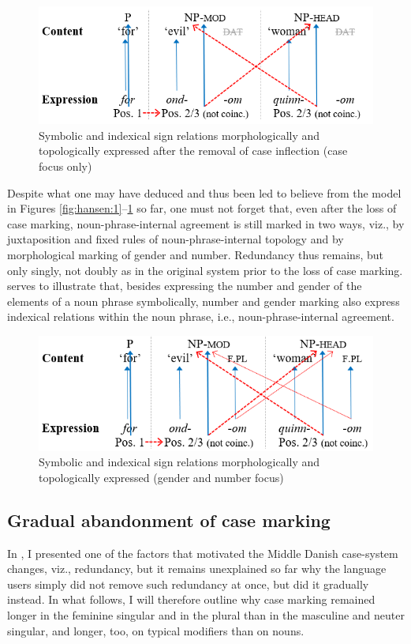 \documentclass[output=paper]{langsci/langscibook}
\begin{document}
\begin{figure}
	\caption{Symbolic and indexical sign relations morphologically and topologically expressed after the removal of case inflection (case focus only)\label{fig:hansen:5}}
	\includegraphics[width=.75\textwidth]{figures/Hansen-fig5.png}
\end{figure}


Despite what one may have deduced and thus been led to believe from the model in Figures \ref{fig:hansen:1}--\ref{fig:hansen:5} so far, one must not forget that, even after the loss of case marking, noun-phrase-internal agreement is still marked in two ways, viz., by juxtaposition and fixed rules of noun-phrase-internal topology and by morphological marking of gender and number. Redundancy thus remains, but only singly, not doubly as in the original system prior to the loss of case marking.  serves to illustrate that, besides expressing the number and gender of the elements of a noun phrase symbolically, number and gender marking also express indexical relations within the noun phrase, i.e., noun-phrase-internal agreement.

\begin{figure}
	\caption{Symbolic and indexical sign relations morphologically and topologically expressed (gender and number focus)\label{fig:hansen:6}}
	\includegraphics[width=.75\textwidth]{figures/Hansen-fig6.png}
\end{figure}


\subsection{Gradual abandonment of case marking} \label{hansen:3.5}

In , I presented one of the factors that motivated the Middle Danish case-system changes, viz., redundancy, but it remains unexplained so far why the language users simply did not remove such redundancy at once, but did it gradually instead. In what follows, I will therefore outline why case marking remained longer in the feminine singular and in the plural than in the masculine and neuter singular, and longer, too, on typical modifiers than on nouns.
\end{document}
